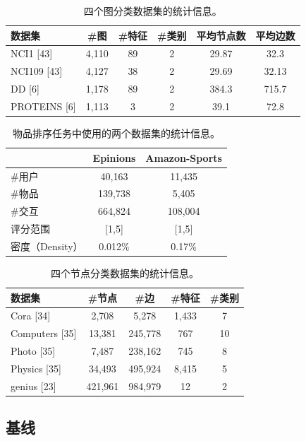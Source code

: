 \documentclass[11pt,UTF8,fontset=fandol]{ctexart}
\begin{document}
\begin{table}[H]\centering
\caption{四个图分类数据集的统计信息。}
\label{tab:18}
\begin{tabular}{lccccc}
\toprule
数据集 & \#图 & \#特征 & \#类别 & 平均节点数 & 平均边数 \\
\midrule
NCI1 [43] & 4,110 & 89 & 2 & 29.87 & 32.3 \\
NCI109 [43] & 4,127 & 38 & 2 & 29.69 & 32.13 \\
DD [6] & 1,178 & 89 & 2 & 384.3 & 715.7 \\
PROTEINS [6] & 1,113 & 3 & 2 & 39.1 & 72.8 \\
\bottomrule
\end{tabular}
\end{table}

\begin{table}[H]\centering
\caption{物品排序任务中使用的两个数据集的统计信息。}
\label{tab:19}
\begin{tabular}{lcc}
\toprule
 & Epinions & Amazon-Sports \\
\midrule
\#用户 & 40,163 & 11,435 \\
\#物品 & 139,738 & 5,405 \\
\#交互 & 664,824 & 108,004 \\
评分范围 & [1,5] & [1,5] \\
密度（Density） & 0.012\% & 0.17\% \\
\bottomrule
\end{tabular}
\end{table}

\begin{table}[H]\centering
\caption{四个节点分类数据集的统计信息。}
\label{tab:20}
\begin{tabular}{lcccc}
\toprule
数据集 & \#节点 & \#边 & \#特征 & \#类别 \\
\midrule
Cora [34] & 2,708 & 5,278 & 1,433 & 7 \\
Computers [35] & 13,381 & 245,778 & 767 & 10 \\
Photo [35] & 7,487 & 238,162 & 745 & 8 \\
Physics [35] & 34,493 & 495,924 & 8,415 & 5 \\
genius [23] & 421,961 & 984,979 & 12 & 2 \\
\bottomrule
\end{tabular}
\end{table}

\subsection{基线}
\end{document}
